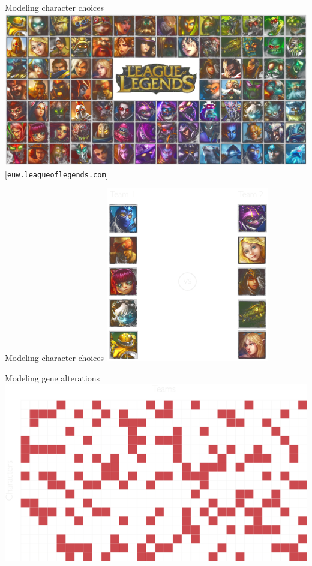 \documentclass[mathserif]{beamer}
\newcommand{\qsource}[1]{%
{\color{col1}\scriptsize\hfill[#1]}
}
\begin{document}
\begin{frame}{Modeling character choices}
\includegraphics[width=\textwidth]{figures/champions_transparent.png}\\
\qsource{\texttt{euw.leagueoflegends.com}}
\end{frame}

\begin{frame}{Modeling character choices}
\centering
\includegraphics[height=3in]{figures/champions5v5.pdf}
\end{frame}

\begin{frame}{Modeling gene alterations}
\centering
\includegraphics[width=\textwidth]{figures/grid_hots.pdf}
\end{frame}
\end{document}

